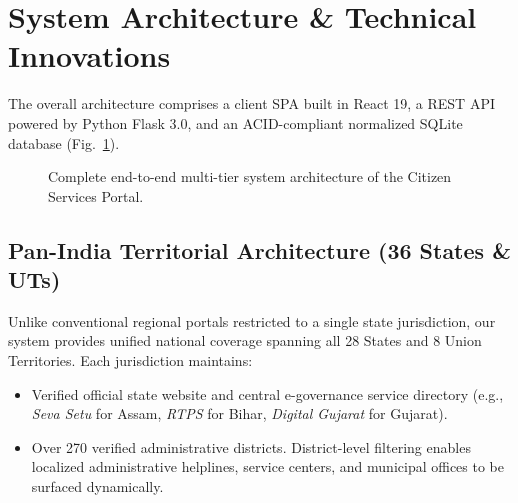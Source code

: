\documentclass[conference]{IEEEtran}
\begin{document}
\section{System Architecture \& Technical Innovations}
The overall architecture comprises a client SPA built in React 19, a REST API powered by Python Flask 3.0, and an ACID-compliant normalized SQLite database (Fig.~\ref{fig:architecture}).

\begin{figure}[htbp]
\centering
{}
\caption{Complete end-to-end multi-tier system architecture of the Citizen Services Portal.}
\label{fig:architecture}
\end{figure}

\subsection{Pan-India Territorial Architecture (36 States \& UTs)}
Unlike conventional regional portals restricted to a single state jurisdiction, our system provides unified national coverage spanning all 28 States and 8 Union Territories. Each jurisdiction maintains:
\begin{itemize}
    \item Verified official state website and central e-governance service directory (e.g., \textit{Seva Setu} for Assam, \textit{RTPS} for Bihar, \textit{Digital Gujarat} for Gujarat).
    \item Over 270 verified administrative districts. District-level filtering enables localized administrative helplines, service centers, and municipal offices to be surfaced dynamically.
\end{itemize}
\end{document}
